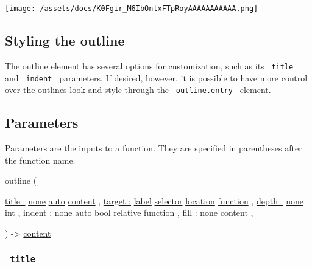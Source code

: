 \texttt{[image: /assets/docs/K0Fgir\_M6IbOnlxFTpRoyAAAAAAAAAAA.png]}

\subsection{Styling the outline}\label{styling-the-outline}

The outline element has several options for customization, such as its
\texttt{\ title\ } and \texttt{\ indent\ } parameters. If desired,
however, it is possible to have more control over the
outline\textquotesingle s look and style through the
\href{/docs/reference/model/outline/\#definitions-entry}{\texttt{\ outline.entry\ }}
element.

\subsection{\texorpdfstring{{ Parameters
}}{ Parameters }}\label{parameters}

\label{parameters-tooltip}
Parameters are the inputs to a function. They are specified in
parentheses after the function name.

{ outline } (

{ \hyperref[parameters-title]{title :}
\href{/docs/reference/foundations/none/}{none}
\href{/docs/reference/foundations/auto/}{auto}
\href{/docs/reference/foundations/content/}{content} , } {
\hyperref[parameters-target]{target :}
\href{/docs/reference/foundations/label/}{label}
\href{/docs/reference/foundations/selector/}{selector}
\href{/docs/reference/introspection/location/}{location}
\href{/docs/reference/foundations/function/}{function} , } {
\hyperref[parameters-depth]{depth :}
\href{/docs/reference/foundations/none/}{none}
\href{/docs/reference/foundations/int/}{int} , } {
\hyperref[parameters-indent]{indent :}
\href{/docs/reference/foundations/none/}{none}
\href{/docs/reference/foundations/auto/}{auto}
\href{/docs/reference/foundations/bool/}{bool}
\href{/docs/reference/layout/relative/}{relative}
\href{/docs/reference/foundations/function/}{function} , } {
\hyperref[parameters-fill]{fill :}
\href{/docs/reference/foundations/none/}{none}
\href{/docs/reference/foundations/content/}{content} , }

) -\textgreater{} \href{/docs/reference/foundations/content/}{content}

\subsubsection{\texorpdfstring{\texttt{\ title\ }}{ title }}\label{parameters-title}

